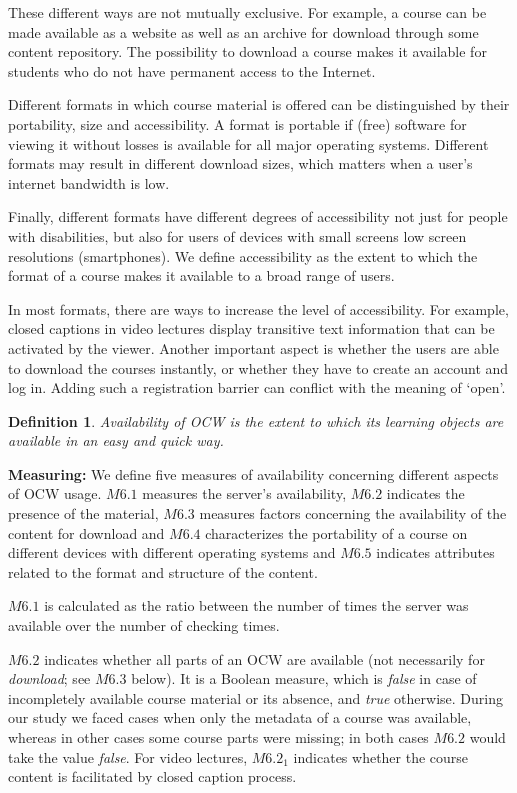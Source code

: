 \documentclass{sig-alternate}
\theoremstyle{definition}
\newtheorem{defn}{Definition}
\begin{document}
These different ways are not mutually exclusive.
For example, a course can be made available as a website as well as an archive for download through some content repository.
The possibility to download a course makes it available for students who do not have permanent access to the Internet.

Different formats in which course material is offered can be distinguished by their portability, size and accessibility.
A format is portable if (free) software for viewing it without losses is available for all major operating systems.
Different formats may result in different download sizes, which matters when a user's internet bandwidth is low.

Finally, different formats have different degrees of accessibility not just for people with disabilities, but also for users of devices with small screens low screen resolutions (smartphones).
We define accessibility as the extent to which the format of a course makes it available to a broad range of users.

In most formats, there are ways to increase the level of accessibility.
For example, closed captions in video lectures display transitive text information that can be activated by the viewer.
Another important aspect is whether the users are able to download the courses instantly, or whether they have to create an account and log in.
Adding such a registration barrier can conflict with the meaning of `open'.

\begin{defn}
\emph {Availability of OCW is the extent to which its learning objects are available in an easy and quick way.}
\end{defn}

\noindent\textbf{Measuring:}
We define five measures of availability concerning different aspects of OCW usage.
$M6.1$ measures the server's availability, $M6.2$ indicates the presence of the material, $M6.3$ measures factors concerning the availability of the content for download and $M6.4$ characterizes the portability of a course on different devices with different operating systems and
$M6.5$ indicates attributes related to the format and structure of the content.

$M6.1$ is calculated as the ratio between the number of times the server was available over the number of checking times.

$M6.2$ indicates whether all parts of an OCW are available (not necessarily for \emph{download}; see $M6.3$ below).
It is a Boolean measure, which is \emph{false} in case of incompletely available course material or its absence, and \emph{true} otherwise.
During our study we faced cases when only the metadata of a course was available, whereas in other cases some course parts were missing; in both cases $M6.2$ would take the value \emph{false}.
For video lectures, $M6.2_1$ indicates whether the course content is facilitated by closed caption process.
\end{document}
